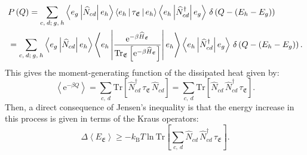 \documentclass[preprints,article,accept,moreauthors,pdftex]{Definitions/mdpi}
\begin{document}
\begin{paracol}{2}
\begin{equation}
    \label{eq:noneq-Land-heat-dist}
    \begin{split}
        &P\left(Q\right) = \sum_{c,\:d;\:g,\:h}\Braket{e_{g}|\!\widehat{N}_{cd}\!|e_{h}}\Braket{e_{h}|\tau_{\mathfrak{E}}|e_{h}}\Braket{e_{h}|\!\widehat{N}_{cd}^{\dagger}\!|e_{g}}\,\delta\left(Q-\left(E_{h}-E_{g}\right)\right)\\
        &= \sum_{c,\:d;\:g,\:h}\Braket{e_{g}|\!\widehat{N}_{cd}\!|e_{h}}\Braket{e_{h}|\!\frac{\mathrm{e}^{-\beta\widehat{H}_{\mathfrak{E}}}}{\mathrm{Tr}_{\mathfrak{E}}\left[\mathrm{e}^{-\beta\widehat{H}_{\mathfrak{E}}}\right]}\!|e_{h}}\Braket{e_{h}|\!\widehat{N}_{cd}^{\dagger}\!|e_{g}}\,\delta\left(Q-\left(E_{h}-E_{g}\right)\right).
    \end{split}
\end{equation}
This gives the moment-generating function of the dissipated heat given by: 
\begin{equation}
    \label{eq:noneq-Land-moment-generating-fn-env}
    \left\langle \mathrm{e}^{-\beta Q}\right\rangle = \sum_{c,\:d}\mathrm{Tr}\left[\widehat{N}_{cd}^{\dagger}\,\tau_{\mathfrak{E}}\,\widehat{N}_{cd}\right] = \sum_{c,\:d}\mathrm{Tr}\left[\widehat{N}_{cd}\,\widehat{N}_{cd}^{\dagger}\,\tau_{\mathfrak{E}}\right].
\end{equation}
Then, a direct consequence of Jensen's inequality is that the energy increase in this process is given in terms of the Kraus operators:
\begin{equation}
    \label{eq:noneq-Land-bound-env}
    \Delta\left\langle E_{\mathfrak{E}}\right\rangle \geq -k_{\mathrm{B}}T\:\mathrm{ln}\:\mathrm{Tr}\left[\sum_{c,\:d}\widehat{N}_{cd}\,\widehat{N}_{cd}^{\dagger}\,\tau_{\mathfrak{E}}\right].
\end{equation}


\end{paracol}
\end{document}
